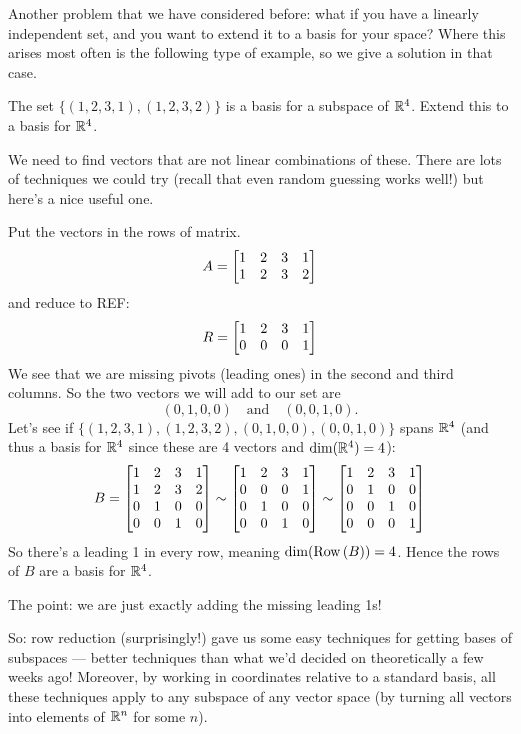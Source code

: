 Another problem that we have considered before:  what if you
have a linearly independent set, and you want to extend it to
a basis for your space?  Where this arises most often is the
following type of example, so we give a solution in that case.

\begin{myprob} The set $\{ (1,2,3,1), (1,2,3,2)\}$ is a basis for a subspace of $\mathbb{R}^4$.
Extend this to a basis for $\mathbb{R}^4$.

\begin{mysol} We need to find vectors that are not linear combinations of these.
There are lots of techniques we could try (recall that even random guessing
works well!) but here's a nice useful one.

Put the vectors in the rows of matrix.
$$
A = \left[ \begin{matrix}  1&2&3&1\\ 1&2&3&2 \end{matrix} \right]
$$
and reduce to REF:
$$
R = \left[ \begin{matrix}  1 & 2&3 & 1\\ 0 & 0 & 0 & 1 \end{matrix} \right]
$$
We see that we are missing pivots (leading ones) in 
the second and third columns.  So the two vectors
we will add to our set are
$$
(0,1,0,0) \quad \textrm{and} \quad (0,0,1,0).
$$
Let's see if $\{ (1,2,3,1), (1,2,3,2), (0,1,0,0), (0,0,1,0)\}$
spans $\mathbb{R}^4$ (and thus a basis for $\mathbb{R}^4$ since
these are 4 vectors and $\dim(\mathbb{R}^4)=4$):
$$
B = \left[ \begin{matrix} 
 1 & 2&3 & 1\\
 1 & 2 & 3 &2\\
 0 & 1 & 0 & 0\\
 0 & 0 & 1 & 0 \end{matrix} \right]
\sim
\left[ \begin{matrix}  1 & 2&3 & 1\\
 0 & 0 & 0 &1\\
 0 & 1 & 0 & 0\\
 0 & 0 & 1 & 0 \end{matrix} \right]
\sim
\left[ \begin{matrix}  1 & 2&3 & 1\\
0 & 1 & 0 & 0\\
 0 & 0 & 1 & 0\\
 0 & 0 & 0 &1 \end{matrix} \right]
$$
So there's a leading 1 in every row, meaning $\dim(\operatorname{Row\,}(B)) = 4$.
Hence the rows of $B$ are a basis for $\mathbb{R}^4$.

The point:  we are just exactly adding the missing leading 1s!
\end{mysol}\end{myprob}

So:  row reduction (surprisingly!) gave us some easy techniques
for getting bases of subspaces --- better techniques than what
we'd decided on theoretically a few weeks ago!  Moreover,
by working in coordinates relative to a standard basis, 
all these techniques apply to any subspace of any vector
space (by turning all vectors into elements of $\mathbb{R}^n$ for some
$n$).

